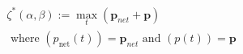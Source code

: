 \begin{equation}
\begin{split}
	\zeta^*(\alpha,\beta) := \max_t(\textbf{p}_{net} + \textbf{p})\\
	\text{ where } (p_\text{net}(t)) = \textbf{p}_{net} \text{ and } (p(t)) = \textbf{p}
\end{split}
\label{ch2:equ:dynamic-cost}
\end{equation}